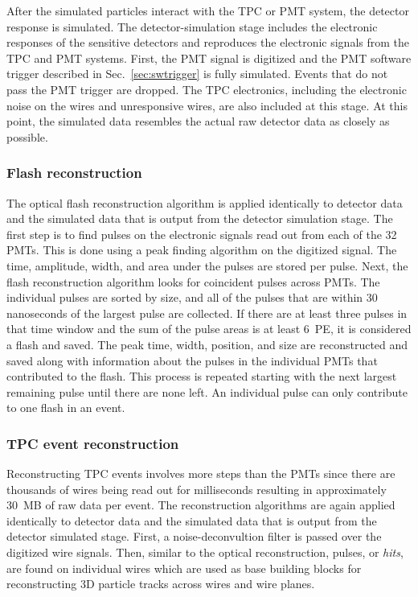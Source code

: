     After the simulated particles interact with the TPC or PMT system, the
    detector response is simulated. The detector-simulation stage includes the
    electronic responses of the sensitive detectors and reproduces the
    electronic signals from the TPC and PMT systems. First, the PMT signal is
    digitized and the PMT software trigger described in
    Sec.~\ref{sec:swtrigger} is fully simulated. Events that do not pass the
    PMT trigger are dropped. The TPC electronics, including the electronic
    noise on the wires and unresponsive wires, are also included at this stage.
    At this point, the simulated data resembles the actual raw detector data as
    closely as possible.

  \subsubsection{Flash reconstruction}
    The optical flash reconstruction algorithm is applied identically to
    detector data and the simulated data that is output from the detector
    simulation stage.  The first step is to find pulses on the electronic
    signals read out from each of the 32 PMTs. This is done using a peak
    finding algorithm on the digitized signal. The time, amplitude, width, and
    area under the pulses are stored per pulse. Next, the flash reconstruction
    algorithm looks for coincident pulses across PMTs. The individual pulses
    are sorted by size, and all of the pulses that are within 30 nanoseconds of
    the largest pulse are collected. If there are at least three pulses in that
    time window and the sum of the pulse areas is at least 6~PE, it is considered a
    flash and saved. The peak time, width, position, and size are reconstructed
    and saved along with information about the pulses in the individual PMTs
    that contributed to the flash. This process is repeated starting with the
    next largest remaining pulse until there are none left. An individual pulse
    can only contribute to one flash in an event.

  \subsubsection{TPC event reconstruction}\label{sec:tpcreco}
    Reconstructing TPC events involves more steps than the PMTs since there are
    thousands of wires being read out for milliseconds resulting in
    approximately 30~MB of raw data per event. The reconstruction algorithms
    are again applied identically to detector data and the simulated data that
    is output from the detector simulated stage. First, a noise-deconvultion
    filter is passed over the digitized wire signals. Then, similar to the
    optical reconstruction, pulses, or \textit{hits}, are found on individual
    wires which are used as base building blocks for reconstructing 3D particle
    tracks across wires and wire planes.

